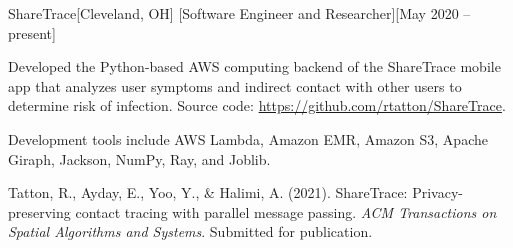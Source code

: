 \begin{ritemize}
{ShareTrace}[Cleveland, OH]
[Software Engineer and Researcher][May 2020 -- present]
	\item Developed the Python-based AWS computing backend of the ShareTrace mobile app that analyzes user symptoms and indirect contact with other users to determine risk of infection. Source code: \url{https://github.com/rtatton/ShareTrace}.
	\item Development tools include AWS Lambda, Amazon EMR, Amazon S3, Apache Giraph, Jackson, NumPy, Ray, and Joblib.
	\item Tatton, R., Ayday, E., Yoo, Y., \& Halimi, A. (2021). ShareTrace: Privacy-preserving contact tracing with parallel message passing. \textit{ACM Transactions on Spatial Algorithms and Systems}. Submitted for publication.
\end{ritemize}